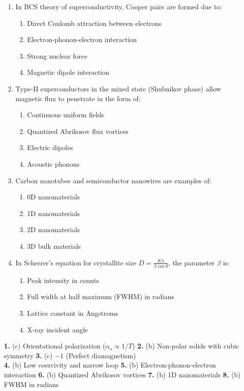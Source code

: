 \begin{enumerate}
    \item In BCS theory of superconductivity, Cooper pairs are formed due to:
    \begin{enumerate}
        \item Direct Coulomb attraction between electrons
        \item Electron-phonon-electron interaction
        \item Strong nuclear force
        \item Magnetic dipole interaction
    \end{enumerate}
    
    \item Type-II superconductors in the mixed state (Shubnikov phase) allow magnetic flux to penetrate in the form of:
    \begin{enumerate}
        \item Continuous uniform fields
        \item Quantized Abrikosov flux vortices
        \item Electric dipoles
        \item Acoustic phonons
    \end{enumerate}
    
    \item Carbon nanotubes and semiconductor nanowires are examples of:
    \begin{enumerate}
        \item 0D nanomaterials
        \item 1D nanomaterials
        \item 2D nanomaterials
        \item 3D bulk materials
    \end{enumerate}
    
    \item In Scherrer's equation for crystallite size $D = \frac{K\lambda}{\beta\cos\theta}$, the parameter $\beta$ is:
    \begin{enumerate}
        \item Peak intensity in counts
        \item Full width at half maximum (FWHM) in radians
        \item Lattice constant in Angstroms
        \item X-ray incident angle
    \end{enumerate}
\end{enumerate}

\begin{solutionbox}
\textbf{1.} (c) Orientational polarization ($\alpha_o \propto 1/T$) \quad \textbar\quad
\textbf{2.} (b) Non-polar solids with cubic symmetry \quad \textbar\quad
\textbf{3.} (c) $-1$ (Perfect diamagnetism) \\
\textbf{4.} (b) Low coercivity and narrow loop \quad \textbar\quad
\textbf{5.} (b) Electron-phonon-electron interaction \quad \textbar\quad
\textbf{6.} (b) Quantized Abrikosov vortices \quad \textbar\quad
\textbf{7.} (b) 1D nanomaterials \quad \textbar\quad
\textbf{8.} (b) FWHM in radians
\end{solutionbox}

